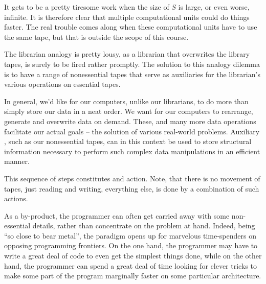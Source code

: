 
It gets to be a pretty tiresome work when the size of $S$ is large, or even
worse, infinite. It is therefore clear that multiple computational units could
do things faster. The real trouble comes along when these computational units
have to use the same tape, but that is outside the scope of this course.

The librarian analogy is pretty lousy, as a librarian that overwrites the
library tapes, is surely to be fired rather promptly. The solution to this
analogy dilemma is to have a range of nonessential tapes that serve as
auxiliaries for the librarian's various operations on essential tapes.


In general, we'd like for our computers, unlike our librarians, to do more than
simply store our data in a neat order. We want for our computers to rearrange,
generate and overwrite data on demand. These, and many more data operations
facilitate our actual goals -- the solution of various real-world problems.
Auxiliary , such as our nonessential tapes, can in this context
be used to store structural information necessary to perform such complex data
manipulations in an efficient manner.

This sequence of steps constitutes and action. Note, that there is no movement
of tapes, just reading and writing, everything else, is done by a combination
of such actions.







\newpage

As a by-product, the programmer can often get carried away with some
non-essential details, rather than concentrate on the problem at hand. Indeed,
being ``so close to bear metal'', the paradigm opens up for marvelous
time-spenders on opposing programming frontiers. On the one hand, the
programmer may have to write a great deal of code to even get the simplest
things done, while on the other hand, the programmer can spend a great deal of
time looking for clever tricks to make some part of the program marginally
faster on some particular architecture.

